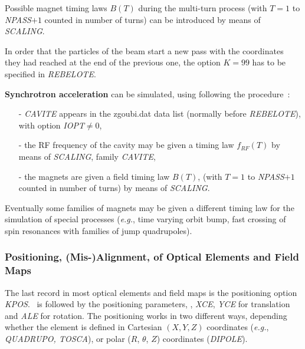 {\medskip

\noindent Possible magnet  timing laws $ B(T)$  during the multi-turn process 
(with $T=1 $ to \textsl{NPASS}$+1$  counted in number of turns) can be introduced by means of \textsl{SCALING}. 

\medskip 

\noindent In order that the \IMAX{} particles of the beam start a new 
pass with the coordinates they had reached at the end of the 
previous one, the option $ K=99 $ has to be specified in \textsl{REBELOTE}.

\medskip


\noindent\textbf{Synchrotron acceleration} can be simulated, using following the procedure~: 
\begin{itemize}
\item[-] \textsl{CAVITE} appears in the zgoubi.dat data list (normally before
\textsl{REBELOTE}), with option \textsl{IOPT}$\neq 0$, 

\item[-] the RF frequency of the cavity may be given a timing law $f_{RF}(T)$ by 
means of \textsl{SCALING}, family \textsl{CAVITE}, 

\item[-] the magnets are given a field  timing law $ B(T)$,  
(with $T=1 $ to \textsl{NPASS}$+1$  counted in number of turns) by means of \textsl{SCALING}. \par
\end{itemize}

\noindent Eventually some families of magnets may be given a different timing law 
    for the simulation of special processes (\emph{e.g.}, time varying orbit bump, 
fast crossing of spin resonances with families of jump quadrupoles). 





\subsubsection{Positioning, (Mis-)Alignment, of Optical Elements and Field Maps} \label{sec4.6.2} 
  

The last record in most optical elements and field maps is the positioning option 
\textsl{KPOS}. \KPOS\ is followed by the positioning parameters, 
\eg, \textsl{XCE}, \textsl{YCE} 
for translation and \textsl{ALE} for rotation. The positioning works in two different ways, 
depending  whether the element is  defined in 
Cartesian $ (X, Y, Z) $ coordinates (\emph{e.g.}, \textsl{QUADRUPO, TOSCA}),
 or polar 
 ($R$, $\theta$, $Z$)  coordinates (\textsl{DIPOLE}). 
 
}

